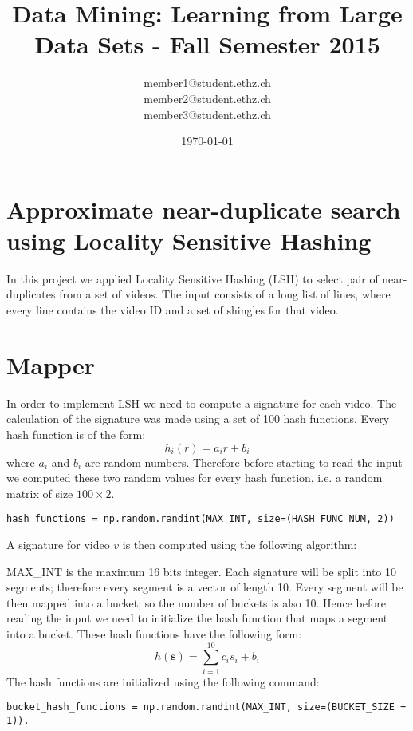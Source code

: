 \documentclass[a4paper, 11pt]{article}
\title{Data Mining: Learning from Large Data Sets - Fall Semester 2015}
\author{member1@student.ethz.ch\\ member2@student.ethz.ch\\ member3@student.ethz.ch\\}
\date{\today}
\begin{document}
\maketitle

\section*{Approximate near-duplicate search using Locality Sensitive Hashing} 
In this project we applied Locality Sensitive Hashing (LSH) to select pair of near-duplicates from a set of videos. The input consists of a long list of lines, where every line contains the video ID and a set of shingles for that video. 
\section{Mapper}
In order to implement LSH we need to compute a signature for each video. The calculation of the signature was made using a set of 100 hash functions. Every hash function is of the form:
\begin{equation}
h_i(r) = a_ir + b_i
\end{equation}
where $a_i$ and $b_i$ are random numbers. Therefore before starting to read the input we computed these two random values for every hash function, i.e. a random matrix of size $100\times 2$.
\begin{lstlisting}
hash_functions = np.random.randint(MAX_INT, size=(HASH_FUNC_NUM, 2))
\end{lstlisting}
A signature for video $v$ is then computed using the following algorithm:
\begin{algorithm}
\end{algorithm}

MAX\_INT is the maximum 16 bits integer. Each signature will be split into 10 segments; therefore every segment is a vector of length 10. Every segment will be then mapped into a bucket; so the number of buckets is also 10. Hence before reading the input we need to initialize the hash function that maps a segment into a bucket. These hash functions have the following form:
\begin{equation}
h(\textbf{s}) = \sum_{i = 1}^{10} c_is_i + b_i
\end{equation}
The hash functions are initialized using the following command:
\begin{lstlisting}
bucket_hash_functions = np.random.randint(MAX_INT, size=(BUCKET_SIZE + 1)).
\end{lstlisting}
\end{document}
